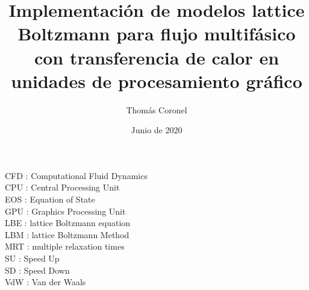 \documentclass[12pt,papel,oneside]{ibtesis}
\title{Implementación de modelos lattice Boltzmann para flujo multifásico con transferencia de calor en unidades de procesamiento gráfico}
\author{Thomás Coronel}
\date{Junio de 2020}
\begin{document}
  


\begin{preliminary}





\tableofcontents                %

\begin{abreviaturas}
	
	CFD : Computational Fluid Dynamics\\
	
	CPU : Central Processing Unit\\
	
	EOS : Equation of State\\
	
	GPU : Graphics Processing Unit\\
	
	LBE : lattice Boltzmann equation\\
	
	LBM : lattice Boltzmann Method\\
	
	MRT : multiple relaxation times\\
	
	SU  : Speed Up\\
	
	SD : Speed Down\\
	
	VdW : Van der Waals\\
	
	
\end{abreviaturas}

\end{preliminary}
\end{document}
